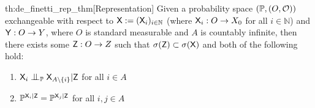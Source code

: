 \begin{reptheorem}{th:de_finetti_rep_thm}[Representation]
Given a probability space $(\mathbb{P},(O,\mathcal{O}))$ exchangeable with respect to $\mathsf{X}:=(\mathsf{X}_i)_{i\in \mathbb{N}}$ (where $\mathsf{X}_i:O\to X_0$ for all $i\in \mathbb{N}$) and $\mathsf{Y}:O\to Y$, where $O$ is standard measurable and $A$ is countably infinite, then there exists some $\mathsf{Z}:O\to Z$ such that $\sigma(\mathsf{Z})\subset \sigma(\mathsf{X})$ and both of the following hold:
\begin{enumerate}
    \item $\RV{X}_i\CI_{\kernel{P}}\RV{X}_{A\setminus\{i\}}|\RV{Z}$ for all $i\in A$
    \item $\mathbb{P}^{\mathsf{X}_i|\mathsf{Z}}=\mathbb{P}^{\mathsf{X}_j|\mathsf{Z}}$ for all $i,j\in A$
\end{enumerate}
\end{reptheorem}

